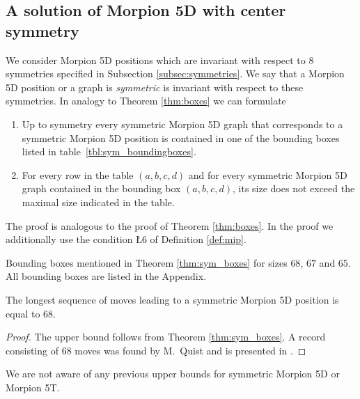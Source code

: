 \subsection{A solution of Morpion 5D with center symmetry}
We consider Morpion 5D positions which are invariant with respect to $8$ symmetries 
specified in Subsection \ref{subsec:symmetries}. We say that a Morpion 5D position or a graph is {\em symmetric} is invariant with respect to these symmetries.  
In analogy to Theorem \ref{thm:boxes} we can formulate 
\begin{theorem}
\begin{enumerate}
\item Up to symmetry every symmetric Morpion 5D graph that corresponds to a symmetric Morpion 5D position
    is contained in one of the bounding boxes listed in table~\ref{tbl:sym_boundingboxes}.
\item For every row in the table $(a,b,c,d)$ and for every symmetric Morpion 5D graph contained in the bounding box  $(a,b,c,d)$,
its size does not exceed the maximal size indicated in the table.
\end{enumerate} 
\label{thm:sym_boxes}
\end{theorem}

The proof is analogous to the proof of Theorem \ref{thm:boxes}. In the proof we additionally use the condition \L{6} of Definition \ref{def:mip}.

\begin{table}[ht]
\centering
 

\caption{Bounding boxes mentioned in Theorem \ref{thm:sym_boxes} for sizes $68$, $67$ and $65$. All bounding boxes are listed in the Appendix. }
\label{tbl:sym_boundingboxes}
\end{table}

\begin{corollary}
\label{cor:68}
The longest sequence of moves leading to a symmetric Morpion 5D position is equal to $68$.
\end{corollary}
\begin{proof} 
The upper bound follows from Theorem \ref{thm:sym_boxes}.
A record consisting of $68$ moves was found by M.~Quist and is presented in \cite{boyer}. 
\end{proof}

We are not aware of any previous upper bounds for symmetric Morpion 5D or Morpion 5T.

